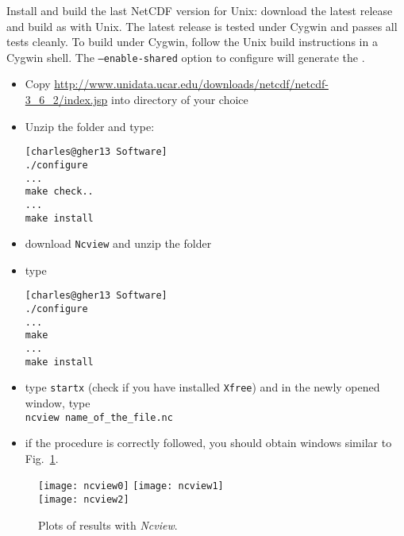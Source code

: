 Install and build the last NetCDF version for Unix: download the latest release and build as with Unix. The latest release is tested under Cygwin and passes all tests cleanly. To build under Cygwin, follow the Unix build instructions in a Cygwin shell. The \texttt{--enable-shared} option to configure will generate the . 


\begin{itemize}
\item Copy \url{http://www.unidata.ucar.edu/downloads/netcdf/netcdf-3_6_2/index.jsp}  into directory of your choice
\item Unzip the folder  and type:
\begin{lstlisting}[style=Bash]
[charles@gher13 Software]
./configure
...
make check..
...
make install
\end{lstlisting}

\item download \texttt{Ncview} and unzip the folder
\item type\\ 
\begin{lstlisting}[style=Bash]
[charles@gher13 Software]
./configure
...
make 
...
make install
\end{lstlisting}

\item type \texttt{startx} (check if you have installed \texttt{Xfree}) and in the newly opened window, type\\
\texttt{ncview name\_of\_the\_file.nc}

\item if the procedure is correctly followed, you should obtain windows similar to Fig.~\ref{fig:ncview}.
\end{itemize}

\begin{figure}[htpb]
\centering
\texttt{[image: ncview0]}\hspace{.5cm} \texttt{[image: ncview1]} \\
\vspace{.5cm}
\texttt{[image: ncview2]} \caption{Plots of results with \textsl{Ncview}.\label{fig:ncview}}
\end{figure}
